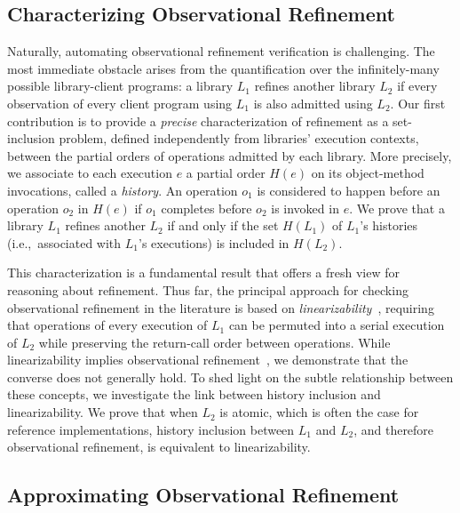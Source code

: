 \subsection{Characterizing Observational Refinement}
\label{sec:intro:histories}

Naturally, automating observational refinement verification is challenging. The
most immediate obstacle arises from the quantification over the infinitely-many
possible library-client programs: a library $L_1$ refines another library $L_2$
if every observation of every client program using $L_1$ is also admitted using
$L_2$. Our first contribution is to provide a \emph{precise} characterization
of refinement as a set-inclusion problem, defined independently from libraries'
execution contexts, between the partial orders of operations admitted by each
library. More precisely, we associate to each execution $e$ a partial order
$H(e)$ on its object-method invocations, called a \emph{history}. An operation
$o_1$ is considered to happen before an operation $o_2$ in $H(e)$ if $o_1$
completes before $o_2$ is invoked in $e$. We prove that a library $L_1$ refines
another $L_2$ if and only if the set $H(L_1)$ of $L_1$'s histories
(i.e.,~associated with $L_1$'s executions) is included in $H(L_2)$.

This characterization is a fundamental result that offers a fresh view for
reasoning about refinement. Thus far, the principal approach for checking
observational refinement in the literature is based on
\emph{linearizability}~\cite{journals/toplas/HerlihyW90}, requiring that
operations of every execution of $L_1$ can be permuted into a serial execution
of $L_2$ while preserving the return-call order between operations. While
linearizability implies observational
refinement~\cite{journals/tcs/FilipovicORY10}, we demonstrate that the converse
does not generally hold. To shed light on the subtle relationship between these
concepts, we investigate the link between history inclusion and
linearizability. We prove that when $L_2$ is atomic, which is often the
case for reference implementations, history inclusion between $L_1$ and
$L_2$, and therefore observational refinement, is equivalent to linearizability.


\subsection{Approximating Observational Refinement}
\label{sec:intro:approx}

